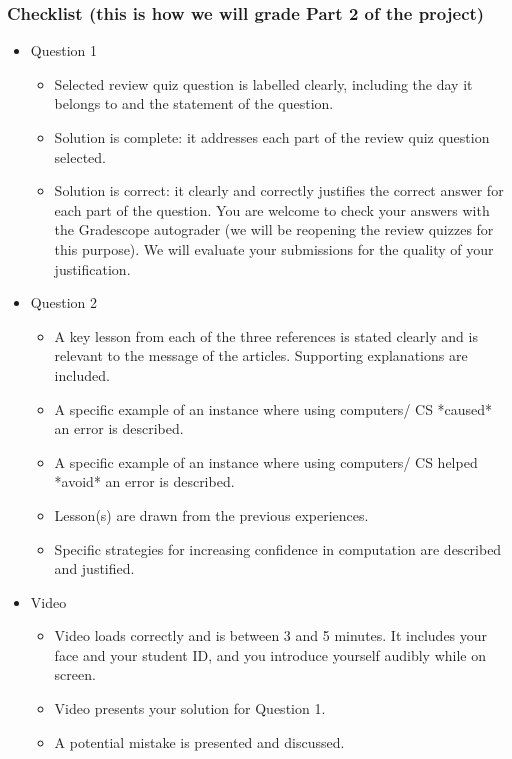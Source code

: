 \documentclass[12pt, oneside]{article}
\begin{document}
\subsubsection*{Checklist (this is how we will grade Part 2 of the project)}
\begin{itemize}
\item Question 1
    \begin{itemize}
        \item Selected review quiz question is labelled clearly, including the day 
        it belongs to and the statement of the question.
        \item Solution is complete: it addresses each part of the review quiz question selected.
        \item Solution is correct: it clearly and correctly justifies the correct answer 
        for each part of the question. You are welcome to check your answers with the 
        Gradescope autograder (we will be reopening the review quizzes for this purpose). 
        We will evaluate your submissions for the quality of your justification.
    \end{itemize}
\item Question 2
    \begin{itemize}
        \item A key lesson from each of the three references is stated clearly and 
        is relevant to the message of the articles. Supporting explanations are included.
        \item A specific example of an instance where using computers/ CS *caused* an error is described.
        \item A specific example of an instance where using computers/ CS helped *avoid* an error is described.
        \item Lesson(s) are drawn from the previous experiences.
        \item Specific strategies for increasing confidence in computation are described and justified.
    \end{itemize}
    \item Video
    \begin{itemize}
        \item Video loads correctly and is between 3 and 5 minutes. It includes your face and your student ID, 
        and you introduce yourself audibly while on screen.
        \item Video presents your solution for Question 1.
        \item A potential mistake is presented and discussed.
    \end{itemize}
\end{itemize}
\end{document}
